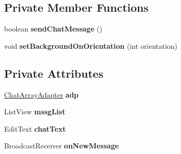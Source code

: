 \subsection*{Private Member Functions}
\begin{DoxyCompactItemize}
\item 
boolean {\bfseries send\+Chat\+Message} ()\hypertarget{classcom_1_1example_1_1sebastian_1_1tindertp_1_1ChatActivity_ae2d5caecba6e1cdfcc3ef5c7d704deb7}{}\label{classcom_1_1example_1_1sebastian_1_1tindertp_1_1ChatActivity_ae2d5caecba6e1cdfcc3ef5c7d704deb7}

\item 
void {\bfseries set\+Background\+On\+Orientation} (int orientation)\hypertarget{classcom_1_1example_1_1sebastian_1_1tindertp_1_1ChatActivity_a46471b9904a662203b2f523dface1fe7}{}\label{classcom_1_1example_1_1sebastian_1_1tindertp_1_1ChatActivity_a46471b9904a662203b2f523dface1fe7}

\end{DoxyCompactItemize}
\subsection*{Private Attributes}
\begin{DoxyCompactItemize}
\item 
\hyperlink{classcom_1_1example_1_1sebastian_1_1tindertp_1_1chatTools_1_1ChatArrayAdapter}{Chat\+Array\+Adapter} {\bfseries adp}\hypertarget{classcom_1_1example_1_1sebastian_1_1tindertp_1_1ChatActivity_a03e16fc7e3d7977fafbdef72d8d462c3}{}\label{classcom_1_1example_1_1sebastian_1_1tindertp_1_1ChatActivity_a03e16fc7e3d7977fafbdef72d8d462c3}

\item 
List\+View {\bfseries mssg\+List}\hypertarget{classcom_1_1example_1_1sebastian_1_1tindertp_1_1ChatActivity_a3516f5b7ee537da41ee12f7a164dfce0}{}\label{classcom_1_1example_1_1sebastian_1_1tindertp_1_1ChatActivity_a3516f5b7ee537da41ee12f7a164dfce0}

\item 
Edit\+Text {\bfseries chat\+Text}\hypertarget{classcom_1_1example_1_1sebastian_1_1tindertp_1_1ChatActivity_ae0a631cc765cb3fe6f952bda309b7a5f}{}\label{classcom_1_1example_1_1sebastian_1_1tindertp_1_1ChatActivity_ae0a631cc765cb3fe6f952bda309b7a5f}

\item 
Broadcast\+Receiver {\bfseries on\+New\+Message}
\end{DoxyCompactItemize}


